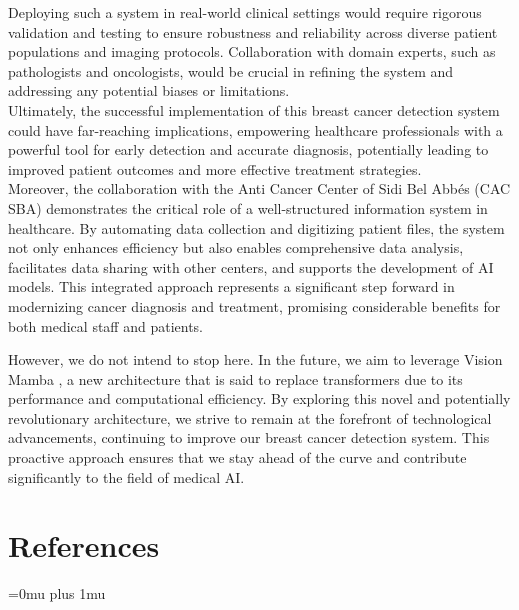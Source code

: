 \documentclass[
11pt, %
english, %
singlespacing, %
headsepline, %
]{project_structure}
\renewcommand\thesection{\arabic{section}}
\begin{document}
\noindent Deploying such a system in real-world clinical settings would require rigorous validation and testing to ensure robustness and reliability across diverse patient populations and imaging protocols. Collaboration with domain experts, such as pathologists and oncologists, would be crucial in refining the system and addressing any potential biases or limitations.\\

\noindent Ultimately, the successful implementation of this breast cancer detection system could have far-reaching implications, empowering healthcare professionals with a powerful tool for early detection and accurate diagnosis, potentially leading to improved patient outcomes and more effective treatment strategies.\\

\noindent Moreover, the collaboration with the Anti Cancer Center of Sidi Bel Abbés (CAC SBA) demonstrates the critical role of a well-structured information system in healthcare. By automating data collection and digitizing patient files, the system not only enhances efficiency but also enables comprehensive data analysis, facilitates data sharing with other centers, and supports the development of AI models. This integrated approach represents a significant step forward in modernizing cancer diagnosis and treatment, promising considerable benefits for both medical staff and patients.

\noindent However, we do not intend to stop here. In the future, we aim to leverage Vision Mamba \cite{VIM}, a new architecture that is said to replace transformers due to its performance and computational efficiency. By exploring this novel and potentially revolutionary architecture, we strive to remain at the forefront of technological advancements, continuing to improve our breast cancer detection system. This proactive approach ensures that we stay ahead of the curve and contribute significantly to the field of medical AI.


\newpage
\section*{References}
\addcontentsline{toc}{section}{\numberline{\thesection}References}

\nocite{ACMIL}
\nocite{BRACS_DATASET}
\nocite{Gigapixel}
\nocite{HIPT}
\nocite{ResNet-OG}
\nocite{FTvsTL}
\nocite{FTandTL}
\nocite{CLAM}
\nocite{Vit}
\nocite{CNNs}
\nocite{CNNs-GFG}
\nocite{CNNs-stanford}
\nocite{Att-Computer-Vision}
\nocite{DINO}
\nocite{Structered-DL-Model}
\nocite{Classification_of_BRCA_hist_CNN}
\nocite{brca-resnet-finetuning}
\nocite{DIETTERICH199731}
\nocite{BreakHis_DATASET}
\nocite{BIOIMAGING}
\nocite{SE-RESNET}
\nocite{BATCH}
\nocite{VIM}
\nocite{NIPS1990_e46de7e1}
\nocite{AttIsAllYouNeed}

\Urlmuskip=0mu plus 1mu
\printbibliography[heading=none]

\end{document}
